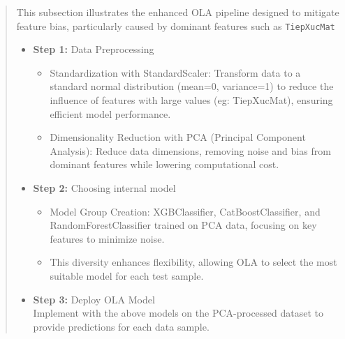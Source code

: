 \documentclass[runningheads]{llncs}
\begin{document}
\begin{abstract}
This subsection illustrates the enhanced OLA pipeline designed to mitigate feature bias, particularly caused by dominant features such as \texttt{TiepXucMat}

\begin{itemize}
\item \textbf{Step 1:} Data Preprocessing~\\
\begin{itemize}
    \item Standardization with StandardScaler: Transform data to a standard normal distribution (mean=0, variance=1) to reduce the influence of features with large values (eg: TiepXucMat), ensuring efficient model performance.  
    \item Dimensionality Reduction with PCA (Principal Component Analysis): Reduce data dimensions, removing noise and bias from dominant features while lowering computational cost.  
\end{itemize}

\item \textbf{Step 2:} Choosing internal model\\
\begin{itemize}
    \item Model Group Creation: XGBClassifier, CatBoostClassifier, and RandomForestClassifier trained on PCA data, focusing on key features to minimize noise.  
    \item This diversity enhances flexibility, allowing OLA to select the most suitable model for each test sample.  
\end{itemize}

\item \textbf{Step 3:} Deploy OLA Model~\\
Implement with the above models on the PCA-processed dataset to provide predictions for each data sample.


\end{itemize}


\end{abstract}
\end{document}
